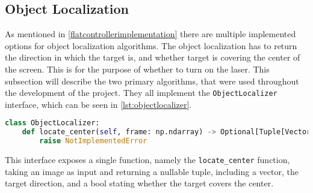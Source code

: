 \subsection{Object Localization}\label{solution:ObjectLocalization}
As mentioned in \autoref{flatcontrollerimplementation} there are multiple implemented options for object localization algorithms.
The object localization has to return the direction in which the target is, and whether target is covering the center of the screen.
This is for the purpose of whether to turn on the laser.
This subsection will describe the two primary algorithms, that were used throughout the development of the project.
They all implement the \texttt{ObjectLocalizer} interface, which can be seen in \autoref{lst:objectlocalizer}.

\begin{lstlisting}[language=Python,label={lst:objectlocalizer},caption={The interface of all object localization algorithms}] 
class ObjectLocalizer:
	def locate_center(self, frame: np.ndarray) -> Optional[Tuple[Vector, bool]]:
		raise NotImplementedError
\end{lstlisting}
This interface exposes a single function, namely the \texttt{locate\_center} function, taking an image as input and returning a nullable tuple, including a vector, the target direction, and a bool stating whether the target covers the center.

